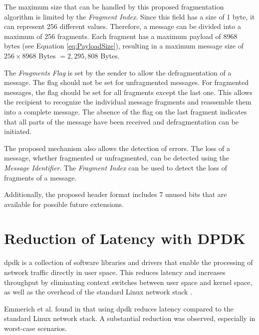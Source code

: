 The maximum size that can be handled by this proposed fragmentation algorithm is limited by the \textit{Fragment Index}. Since this field has a size of 1 byte, it can represent 256 different values. Therefore, a message can be divided into a maximum of 256 fragments. Each fragment has a maximum payload of 8968 bytes (see Equation \ref{eq:PayloadSize}), resulting in a maximum message size of $256 \times 8968$ Bytes $= 2,295,808$ Bytes.

The \textit{Fragments Flag} is set by the sender to allow the defragmentation of a message. The flag should not be set for unfragmented messages. For fragmented messages, the flag should be set for all fragments except the last one. This allows the recipient to recognize the individual message fragments and reassemble them into a complete message. The absence of the flag on the last fragment indicates that all parts of the message have been received and defragmentation can be initiated.

The proposed mechanism also allows the detection of errors. The loss of a message, whether fragmented or unfragmented, can be detected using the \textit{Message Identifier}. The \textit{Fragment Index} can be used to detect the loss of fragments of a message.

Additionally, the proposed header format includes 7 unused bits that are available for possible future extensions.


\section{Reduction of Latency with DPDK}
\ac{dpdk} is a collection of software libraries and drivers that enable the processing of network traffic directly in user space. This reduces latency and increases throughput by eliminating context switches between user space and kernel space, as well as the overhead of the standard Linux network stack \cite{outl02}.

Emmerich et al. found in \cite{outl01} that using \ac{dpdk} reduces latency compared to the standard Linux network stack. A substantial reduction was observed, especially in worst-case scenarios.